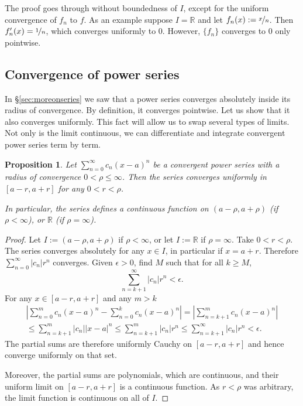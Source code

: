 \documentclass[12pt]{book}
\newcommand{\abs}[1]{\left\lvert {#1} \right\rvert}
\newcommand{\R}{{\mathbb{R}}}
\theoremstyle{plain}
\newtheorem{prop}[thm]{Proposition}
\theoremstyle{remark}
\theoremstyle{definition}
\theoremstyle{exercise}
\theoremstyle{example}
\newcommand{\sectionref}[1]{\hyperref[#1]{\S\ref*{#1}}}
\begin{document}
The proof goes through without boundedness of $I$, except for the
uniform convergence of $f_n$ to $f$.  As an example suppose $I = \R$ and let
$f_n(x) := \nicefrac{x}{n}$.  Then $f_n'(x)=\nicefrac{1}{n}$, which
converges uniformly to $0$.  However, $\{f_n\}$ converges to 0 only pointwise.

\subsection{Convergence of power series}

In \sectionref{sec:moreonseries} we saw that a power series converges
absolutely inside its radius of convergence.
By definition, it converges pointwise.
Let us show that it also converges uniformly.  This fact will allow us to
swap several types of limits.  Not only is the limit continuous,
we can differentiate
and integrate convergent power series term by term.

\begin{prop}
Let $\sum_{n=0}^\infty c_n {(x-a)}^n$ be a convergent power series with a radius
of convergence $0 < \rho \leq \infty$.
Then the series converges uniformly
in $[a-r,a+r]$ for any $0 < r < \rho$.

In particular, the series defines a continuous function
on $(a-\rho,a+\rho)$ (if $\rho < \infty$), or $\R$ (if $\rho = \infty$).
\end{prop}

\begin{proof}
Let $I := (a-\rho,a+\rho)$ if $\rho < \infty$,
or let $I := \R$ if $\rho= \infty$.
Take $0 < r < \rho$.
The series converges absolutely for any $x \in I$,
in particular if $x = a+r$.
Therefore $\sum_{n=0}^\infty \abs{c_n} r^n$ converges.
Given $\epsilon >0$, find $M$ such that for all $k \geq M$,
\begin{equation*}
\sum_{n=k+1}^\infty \abs{c_n} {r}^n < \epsilon .
\end{equation*}
For any $x \in [a-r,a+r]$ and any $m > k$
\begin{multline*}
\abs{\sum_{n=0}^m c_n {(x-a)}^n - 
\sum_{n=0}^k c_n {(x-a)}^n}
=
\abs{\sum_{n=k+1}^m c_n {(x-a)}^n}
\\
\leq
\sum_{n=k+1}^m \abs{c_n} {\abs{x-a}}^n
\leq
\sum_{n=k+1}^m \abs{c_n} {r}^n
\leq
\sum_{n=k+1}^\infty \abs{c_n} {r}^n
<\epsilon.
\end{multline*}
The partial sums are therefore uniformly Cauchy on $[a-r,a+r]$ and
hence converge uniformly on that set.

Moreover, the partial sums are polynomials, which are
continuous, and their uniform limit on $[a-r,a+r]$
is a continuous function.
As $r < \rho$ was arbitrary, the limit function
is continuous on all of $I$.
\end{proof}
\end{document}
